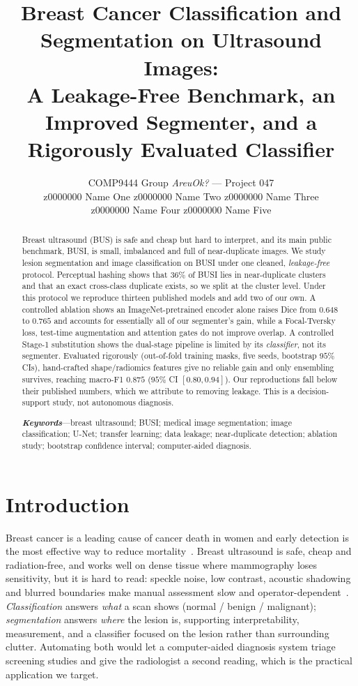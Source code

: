 \documentclass[10pt,twocolumn]{article}
\title{\vspace{-2.4em}\textbf{Breast Cancer Classification and Segmentation on
Ultrasound Images:\\ A Leakage-Free Benchmark, an Improved Segmenter, and a
Rigorously Evaluated Classifier}\vspace{-0.5em}}
\author{\normalsize COMP9444 Group \emph{AreuOk?} --- Project 047\\[2pt]
\normalsize z0000000 Name One \quad z0000000 Name Two \quad z0000000 Name Three\\
\normalsize z0000000 Name Four \quad z0000000 Name Five\vspace{-1.2em}}
\date{}
\begin{document}
\maketitle

\begin{abstract}
\noindent\small
Breast ultrasound (BUS) is safe and cheap but hard to interpret, and its main
public benchmark, BUSI, is small, imbalanced and full of near-duplicate images.
We study lesion segmentation and image classification on BUSI under one cleaned,
\emph{leakage-free} protocol. Perceptual hashing shows that $36\%$ of BUSI lies in
near-duplicate clusters and that an exact cross-class duplicate exists, so we
split at the cluster level. Under this protocol we reproduce thirteen published
models and add two of our own. A controlled ablation shows an ImageNet-pretrained
encoder alone raises Dice from $0.648$ to $0.765$ and accounts for essentially all
of our segmenter's gain, while a Focal-Tversky loss, test-time augmentation and
attention gates do not improve overlap. A controlled Stage-1 substitution shows
the dual-stage pipeline is limited by its \emph{classifier}, not its segmenter.
Evaluated rigorously (out-of-fold training masks, five seeds, bootstrap $95\%$
CIs), hand-crafted shape/radiomics features give no reliable gain and only
ensembling survives, reaching macro-F1 $0.875$ ($95\%$ CI $[0.80,0.94]$). Our
reproductions fall below their published numbers, which we attribute to removing
leakage. This is a decision-support study, not autonomous diagnosis.

\vspace{4pt}
\noindent\textit{\textbf{Keywords}}---breast ultrasound; BUSI; medical image
segmentation; image classification; U-Net; transfer learning; data leakage;
near-duplicate detection; ablation study; bootstrap confidence interval;
computer-aided diagnosis.
\end{abstract}

\section{Introduction}
Breast cancer is a leading cause of cancer death in women and early detection is
the most effective way to reduce mortality~\cite{cheng2010survey}. Breast
ultrasound is safe, cheap and radiation-free, and works well on dense tissue where
mammography loses sensitivity, but it is hard to read: speckle noise, low
contrast, acoustic shadowing and blurred boundaries make manual assessment slow
and operator-dependent~\cite{xian2018survey}. \emph{Classification} answers
\emph{what} a scan shows (normal / benign / malignant); \emph{segmentation}
answers \emph{where} the lesion is, supporting interpretability, measurement, and
a classifier focused on the lesion rather than surrounding clutter. Automating
both would let a computer-aided diagnosis system triage screening studies and give
the radiologist a second reading, which is the practical application we target.
\end{document}
